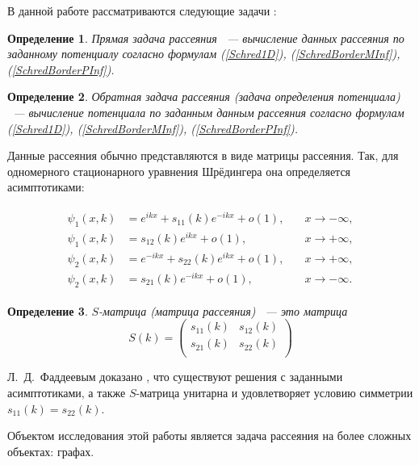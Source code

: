 \documentclass[a4 paper, 12 pt]{extarticle}
\newtheorem{Def}{Определение}[section]
\begin{document}
   \pagebreak
   В данной работе рассматриваются следующие задачи \cite{Soliton}: 

   \begin{Def}
   	Прямая задача рассеяния ~--- вычисление данных рассеяния по заданному потенциалу согласно формулам (\ref{Schred1D}), (\ref{SchredBorderMInf}), (\ref{SchredBorderPInf}).
   \end{Def}

   \begin{Def}
   	Обратная задача рассеяния (задача определения потенциала) ~--- вычисление потенциала по заданным данным рассеяния согласно формулам (\ref{Schred1D}), (\ref{SchredBorderMInf}), (\ref{SchredBorderPInf}).
   \end{Def}

   Данные рассеяния обычно представляются в виде матрицы рассеяния. Так, для одномерного стационарного уравнения Шрёдингера она определяется асимптотиками:
   
   \begin{gather*}
   \begin{aligned}
   \psi_1(x,k)&=e^{ikx}+s_{11}(k)e^{-ikx}+o(1), \quad &x\rightarrow-\infty,\\
   \psi_1(x,k)&=s_{12}(k)e^{ikx}+o(1), \quad &x\rightarrow+\infty,\\
   \psi_2(x,k)&=e^{-ikx}+s_{22}(k)e^{ikx}+o(1), \quad &x\rightarrow+\infty,\\
   \psi_2(x,k)&=s_{21}(k)e^{-ikx}+o(1), \quad &x\rightarrow-\infty.
   \end{aligned}
   \end{gather*}
   

   \begin{Def}
   	$S$-матрица (матрица рассеяния) ~--- это матрица 
    \begin{equation}\label{DSM}
    S(k)=\left(%
    \begin{array}{cc}
    s_{11}(k) & s_{12}(k) \\
    s_{21}(k) & s_{22}(k) \\
    \end{array}%
    \right)
    \end{equation}
   \end{Def}

   Л.~Д.~Фаддеевым доказано \cite{SMatrix}, что существуют решения с заданными асимптотиками, а также $S$-матрица унитарна и удовлетворяет условию симметрии $s_{11}\left(k\right) = s_{22}\left(k\right)$.
   
   Объектом исследования этой работы является задача рассеяния на более сложных объектах: графах.
   
\end{document}
